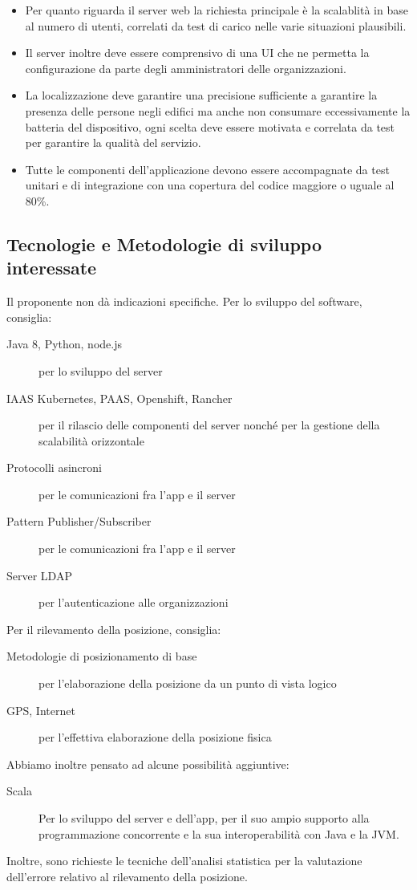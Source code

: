 \documentclass[../studio-di-fattibilita.tex]{subfiles}
\begin{document}
\begin{itemize}
		\item Per quanto riguarda il server web la richiesta principale è la scalablità in base al numero di utenti, correlati da test di carico nelle varie situazioni plausibili.
		\item	Il server inoltre deve essere comprensivo di una UI che ne permetta la configurazione da parte degli amministratori delle organizzazioni.
		\item La localizzazione deve garantire una precisione sufficiente a garantire la presenza delle persone negli edifici ma anche non consumare eccessivamente la batteria del dispositivo, ogni scelta deve essere motivata e correlata da test per garantire la qualità del servizio.
		\item Tutte le componenti dell’applicazione devono essere accompagnate da test unitari e di integrazione con una copertura del codice maggiore o uguale al 80\%. 
	\end{itemize}
	\subsection{Tecnologie e Metodologie di sviluppo interessate}
	\label{sec:tecnologie_interessate}
	Il proponente non dà indicazioni specifiche. Per lo sviluppo del software, consiglia:
	\begin{description}
		\item[Java 8, Python, node.js] per lo sviluppo del server
		\item[IAAS Kubernetes, PAAS, Openshift, Rancher] per il rilascio delle componenti del server nonché per la gestione della scalabilità orizzontale
		\item[Protocolli asincroni] per le comunicazioni fra l'app e il server
		\item[Pattern Publisher/Subscriber] per le comunicazioni fra l'app e il server
		\item[Server LDAP] per l'autenticazione alle organizzazioni 
	\end{description}
	Per il rilevamento della posizione, consiglia:
	\begin{description}
		\item[Metodologie di posizionamento di base] per l'elaborazione della posizione da un punto di vista logico
		\item[GPS, Internet] per l'effettiva elaborazione della posizione fisica
	\end{description}
	Abbiamo inoltre pensato ad alcune possibilità aggiuntive:
	\begin{description}
		\item[Scala] Per lo sviluppo del server e dell'app, per il suo ampio supporto alla programmazione concorrente e la sua interoperabilità con Java e la JVM.
	\end{description}
	Inoltre, sono richieste le tecniche dell'analisi statistica per la valutazione dell'errore relativo al rilevamento della posizione.
\end{document}
